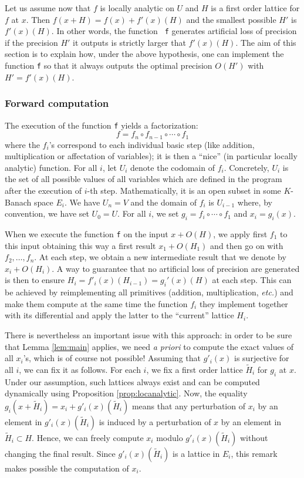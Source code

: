 \documentclass{lms}
\begin{document}
Let us assume now that $f$ is locally analytic on $U$ and $H$ is a first 
order lattice for $f$ at $x$. Then $f(x+H) = f(x) + f'(x)(H)$ and the 
smallest possible $H'$ is $f'(x)(H)$. In other words, the function {\tt 
f} generates artificial loss of precision if the precision $H'$ it 
outputs is strictly larger that $f'(x)(H)$. The aim of this section is 
to explain how, under the above hypothesis, one can implement the 
function {\tt f} so that it always outputs the optimal precision $O(H')$ 
with $H' = f'(x)(H)$.

\subsubsection*{Forward computation}

The execution of the function {\tt f} yields a factorization:
$$f = f_n \circ f_{n-1} \circ \cdots \circ f_1$$
where the $f_i$'s correspond to each individual basic step (like 
addition, multiplication or affectation of variables); it is then a
``nice'' (in particular locally analytic) function. For all 
$i$, let $U_i$ denote the codomain of $f_i$. Concretely, $U_i$ is the 
set of all possible values of all variables which are defined in the 
program after the execution of $i$-th step. Mathematically, it is an 
open subset in some $K$-Banach space $E_i$. We have $U_n = V$ and the 
domain of $f_i$ is $U_{i-1}$ where, by convention, we have set $U_0 = 
U$.
For all $i$, we set $g_i = f_i \circ \cdots \circ f_1$ and $x_i = 
g_i(x)$. 

When we execute the function {\tt f} on the input $x + O(H)$, we apply 
first $f_1$ to this input obtaining this way a first result $x_1 + 
O(H_1)$ and then go on with $f_2, \ldots, f_n$. At each step, we obtain 
a new intermediate result that we denote by $x_i + O(H_i)$. A way to 
guarantee that no artificial loss of precision are generated is then to 
ensure $H_i = f'_i(x)(H_{i-1}) = g_i'(x)(H)$ at each step. This can be 
achieved by reimplementing all primitives (addition, multiplication, 
\emph{etc.}) and make them compute at the same time the function $f_i$
they implement together with its differential and apply the latter to
the ``current'' lattice $H_i$.

There is nevertheless an important issue with this approach: in order to 
be sure that Lemma \ref{lem:main} applies, we need \emph{a priori} to 
compute the exact values of all $x_i$'s, which is of course not 
possible! Assuming that $g'_i(x)$ is surjective for all $i$, we can fix 
it as follows. For each $i$, we fix a first order lattice $\tilde H_i$ 
for $g_i$ at $x$. Under our assumption, such lattices always exist and 
can be computed dynamically using Proposition \ref{prop:locanalytic}. 
Now, the equality $g_i(x + \tilde H_i) = x_i + g'_i(x)(\tilde H_i)$ 
means that any perturbation of $x_i$ by an element in $g'_i(x) (\tilde 
H_i)$ is induced by a perturbation of $x$ by an element in $\tilde H_i 
\subset H$. Hence, we can freely compute $x_i$ modulo $g'_i(x) (\tilde 
H_i)$ without changing the final result. Since $g'_i(x)(\tilde H_i)$ is 
a lattice in $E_i$, this remark makes possible the computation of $x_i$.
\end{document}
